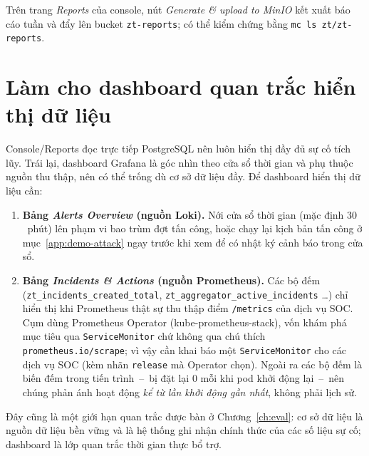 Trên trang \emph{Reports} của console, nút \emph{Generate \& upload to MinIO} kết xuất
báo cáo tuần và đẩy lên bucket \texttt{zt-reports}; có thể kiểm chứng bằng
\texttt{mc ls zt/zt-reports}.

\section{Làm cho dashboard quan trắc hiển thị dữ liệu}
\label{app:demo-grafana}

Console/Reports đọc trực tiếp PostgreSQL nên luôn hiển thị đầy đủ sự cố tích lũy. Trái
lại, dashboard Grafana là góc nhìn theo cửa sổ thời gian và phụ thuộc nguồn thu thập, nên
có thể trống dù cơ sở dữ liệu đầy. Để dashboard hiển thị dữ liệu cần:

\begin{enumerate}
  \item \textbf{Bảng \emph{Alerts Overview} (nguồn Loki).} Nới cửa sổ thời gian (mặc định
        $30$~phút) lên phạm vi bao trùm đợt tấn công, hoặc chạy lại kịch bản tấn công
        ở mục~\ref{app:demo-attack} ngay trước khi xem để có nhật ký cảnh báo trong cửa sổ.
  \item \textbf{Bảng \emph{Incidents \& Actions} (nguồn Prometheus).} Các bộ đếm
        (\texttt{zt\_incidents\_created\_total}, \texttt{zt\_aggregator\_active\_incidents}
        \ldots) chỉ hiển thị khi Prometheus thật sự thu thập điểm \texttt{/metrics} của
        dịch vụ SOC. Cụm dùng Prometheus Operator (kube-prometheus-stack), vốn khám phá
        mục tiêu qua \texttt{ServiceMonitor} chứ không qua chú thích
        \texttt{prometheus.io/scrape}; vì vậy cần khai báo một \texttt{ServiceMonitor} cho
        các dịch vụ SOC (kèm nhãn \texttt{release} mà Operator chọn). Ngoài ra các bộ đếm
        là biến đếm trong tiến trình~--~bị đặt lại $0$ mỗi khi pod khởi động lại~--~nên
        chúng phản ánh hoạt động \emph{kể từ lần khởi động gần nhất}, không phải lịch sử.
\end{enumerate}

\noindent Đây cũng là một giới hạn quan trắc được bàn ở Chương~\ref{ch:eval}: cơ sở dữ
liệu là nguồn dữ liệu bền vững và là hệ thống ghi nhận chính thức của các số liệu sự cố;
dashboard là lớp quan trắc thời gian thực bổ trợ.
